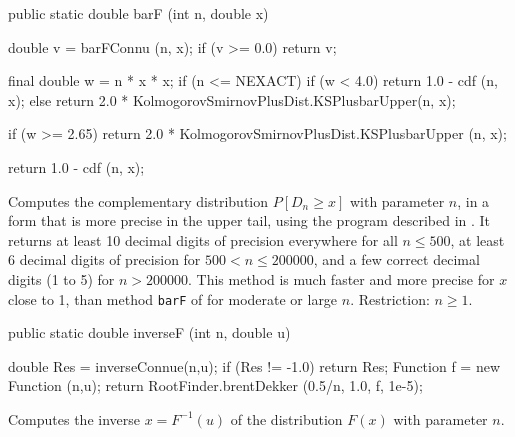 \begin{code}

   public static double barF (int n, double x)\begin{hide} {
      double v = barFConnu (n, x);
      if (v >= 0.0)
         return v;

      final double w = n * x * x;
      if (n <= NEXACT) {
         if (w < 4.0)
            return 1.0 - cdf (n, x);
         else
            return 2.0 * KolmogorovSmirnovPlusDist.KSPlusbarUpper(n, x);
      }

      if (w >= 2.65)
         return 2.0 * KolmogorovSmirnovPlusDist.KSPlusbarUpper (n, x);

      return 1.0 - cdf (n, x);
   }\end{hide}
\end{code}
\begin{tabb}
 Computes the complementary \ks{} distribution
$P[D_n \ge x]$ with parameter $n$,
 in a form that is more precise in the upper tail,
using the program described in \cite{tSIM11a}.
It returns at least 10 decimal digits of precision everywhere for all
 $n \le 500$,
 at least 6 decimal digits of precision for $500 < n \le 200000$,
and a few correct decimal digits (1 to 5) for $n > 200000$.
This method is much faster and more precise for $x$ close to 1, than
 method \texttt{barF} of
 for moderate or large $n$.
 Restriction:  $n\ge 1$.
\end{tabb}
\begin{code}

   public static double inverseF (int n, double u)\begin{hide} {
      double Res = inverseConnue(n,u);
      if (Res != -1.0)
         return Res;
      Function f = new Function (n,u);
      return RootFinder.brentDekker (0.5/n, 1.0, f, 1e-5);
   }\end{hide}
\end{code}
\begin{tabb}
  Computes the inverse $x = F^{-1}(u)$ of the
  distribution $F(x)$ with parameter $n$.
\end{tabb}
\begin{code}\begin{hide}
}\end{hide}
\end{code}
